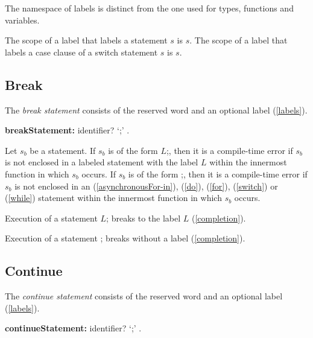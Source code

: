\documentclass{article}
\newcommand{\code}[1]{{\sf #1}}
\begin{document}
\LMHash{}
The namespace of labels is distinct from the one used for types, functions and variables.

\LMHash{}
The scope of a label that labels a statement $s$ is $s$. The scope of a label that labels a case clause of a switch statement $s$ is $s$.



\subsection{ Break}

\LMHash{}
The {\em break statement} consists of the reserved word \BREAK{} and an optional label (\ref{labels}).

\begin{grammar}
{\bf breakStatement:}
     \BREAK{} identifier? `{\escapegrammar ;}'
    .
 \end{grammar}

\LMHash{}
Let $s_b$ be a \BREAK{} statement.
If $s_b$ is of the form \code{\BREAK{} $L$;},
then it is a compile-time error if $s_b$ is not enclosed in a labeled statement
with the label $L$ within the innermost function in which $s_b$ occurs.
If $s_b$ is of the form \code{\BREAK{};},
then it is a compile-time error if $s_b$ is not enclosed in an
\code{\AWAIT{} \FOR{}} (\ref{asynchronousFor-in}),
\DO{} (\ref{do}), \FOR{} (\ref{for}), \SWITCH{} (\ref{switch})
or \WHILE{} (\ref{while}) statement within the innermost function in which $s_b$ occurs.

\LMHash{}
Execution of a \BREAK{} statement \code{\BREAK{} $L$;} breaks to the label $L$ (\ref{completion}).

Execution of a \BREAK{} statement \code{\BREAK{};} breaks without a label (\ref{completion}).


\subsection{ Continue}

\LMHash{}
The {\em continue statement} consists of the reserved word \CONTINUE{} and an optional label (\ref{labels}).

\begin{grammar}
{\bf continueStatement:}
    \CONTINUE{} identifier? `{\escapegrammar ;}'
        .
 \end{grammar}
\end{document}
